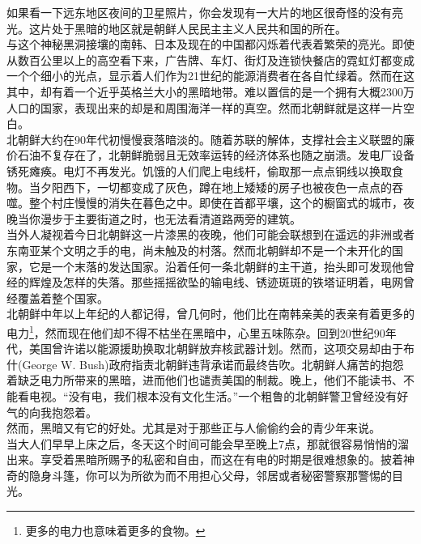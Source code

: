 \ifnum{}
	\begin{multicols}{\theparacolNo}
\fi
如果看一下远东地区夜间的卫星照片，你会发现有一大片的地区很奇怪的没有亮光。这片处于黑暗的地区就是朝鲜人民民主主义人民共和国的所在。\\

与这个神秘黑洞接壤的南韩、日本及现在的中国都闪烁着代表着繁荣的亮光。即使从数百公里以上的高空看下来，广告牌、车灯、街灯及连锁快餐店的霓虹灯都变成一个个细小的光点，显示着人们作为21世纪的能源消费者在各自忙绿着。然而在这其中，却有着一个近乎英格兰大小的黑暗地带。难以置信的是一个拥有大概2300万人口的国家，表现出来的却是和周围海洋一样的真空。然而北朝鲜就是这样一片空白。\\

北朝鲜大约在90年代初慢慢衰落暗淡的。随着苏联的解体，支撑社会主义联盟的廉价石油不复存在了，北朝鲜脆弱且无效率运转的经济体系也随之崩溃。发电厂设备锈死瘫痪。电灯不再发光。饥饿的人们爬上电线杆，偷取那一点点铜线以换取食物。当夕阳西下，一切都变成了灰色，蹲在地上矮矮的房子也被夜色一点点的吞噬。整个村庄慢慢的消失在暮色之中。即使在首都平壤，这个的橱窗式的城市，夜晚当你漫步于主要街道之时，也无法看清道路两旁的建筑。\\

当外人凝视着今日北朝鲜这一片漆黑的夜晚，他们可能会联想到在遥远的非洲或者东南亚某个文明之手的电，尚未触及的村落。然而北朝鲜却不是一个未开化的国家，它是一个末落的发达国家。沿着任何一条北朝鲜的主干道，抬头即可发现他曾经的辉煌及怎样的失落。那些摇摇欲坠的输电线、锈迹斑斑的铁塔证明着，电网曾经覆盖着整个国家。\\

北朝鲜中年以上年纪的人都记得，曾几何时，他们比在南韩亲美的表亲有着更多的电力\footnote{更多的电力也意味着更多的食物。}，然而现在他们却不得不枯坐在黑暗中，心里五味陈杂。回到20世纪90年代，美国曾许诺以能源援助换取北朝鲜放弃核武器计划。然而，这项交易却由于布什(George W. Bush)政府指责北朝鲜违背承诺而最终告吹。北朝鲜人痛苦的抱怨着缺乏电力所带来的黑暗，进而他们也谴责美国的制裁。晚上，他们不能读书、不能看电视。“没有电，我们根本没有文化生活。”一个粗鲁的北朝鲜警卫曾经没有好气的向我抱怨着。\\

然而，黑暗又有它的好处。尤其是对于那些正与人偷偷约会的青少年来说。\\

当大人们早早上床之后，冬天这个时间可能会早至晚上7点，那就很容易悄悄的溜出来。享受着黑暗所赐予的私密和自由，而这在有电的时期是很难想象的。披着神奇的隐身斗篷，你可以为所欲为而不用担心父母，邻居或者秘密警察那警惕的目光。\\


\end{multicols}
